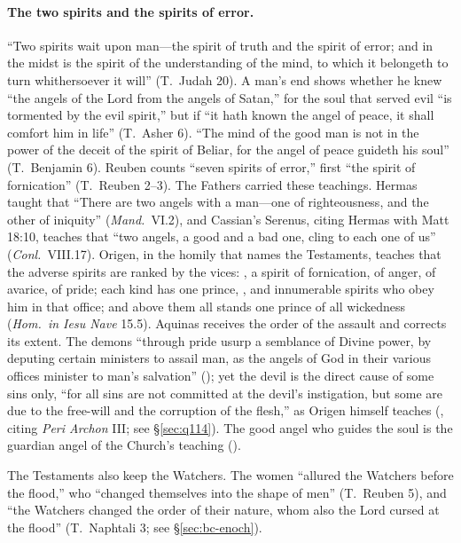 \paragraph{The two spirits and the spirits of error.} ``Two spirits wait upon
man---the spirit of truth and the spirit of error; and in the midst is the
spirit of the understanding of the mind, to which it belongeth to turn
whithersoever it will'' (T.~Judah 20). A man's end shows whether he knew
``the angels of the Lord from the angels of Satan,'' for the soul that served
evil ``is tormented by the evil spirit,'' but if ``it hath known the angel of
peace, it shall comfort him in life'' (T.~Asher 6). ``The
mind of the good man is not in the power of the deceit of the spirit of
Beliar, for the angel of peace guideth his soul'' (T.~Benjamin 6). Reuben
counts ``seven spirits of error,'' first ``the spirit of fornication''
(T.~Reuben 2--3). The Fathers carried these teachings. Hermas taught that ``There are
two angels with a man---one of righteousness, and the other of iniquity''
(\emph{Mand.}\ VI.2), and Cassian's Serenus, citing Hermas with Matt 18:10,
teaches that ``two angels, a good and a bad one, cling to each one of us''
(\emph{Conl.}\ VIII.17). Origen, in the homily that names the Testaments,
teaches that the adverse spirits are ranked by the vices: , a spirit of fornication, of anger, of avarice, of pride; each
kind has one prince, , and innumerable spirits who obey him in that office; and above them
all stands one prince of all wickedness (\emph{Hom.\ in Iesu Nave} 15.5).
Aquinas receives the order of the assault and corrects its extent. The
demons ``through pride usurp a semblance of Divine power, by deputing
certain ministers to assail man, as the angels of God in their various
offices minister to man's salvation'' (); yet the devil is
the direct cause of some sins only, ``for all sins are not committed at the
devil's instigation, but some are due to the free-will and the corruption of
the flesh,'' as Origen himself teaches (, citing \emph{Peri
Archon} III; see \S\ref{sec:q114}). The good angel who guides the soul is the
guardian angel of the Church's teaching ().

The Testaments also keep the Watchers. The women ``allured the Watchers
before the flood,'' who ``changed themselves into the shape of men'' (T.~Reuben
5), and ``the Watchers changed the order of their nature, whom also the Lord
cursed at the flood'' (T.~Naphtali 3; see \S\ref{sec:bc-enoch}).


